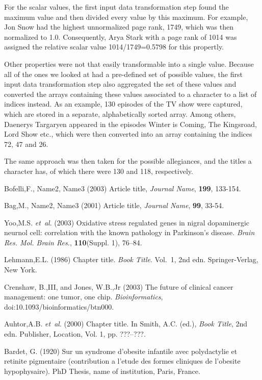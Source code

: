 \documentclass{bioinfo}
\begin{document}
For the scalar values, the first input data transformation step found the maximum value and then divided every value by this maximum. For example, Jon Snow had the highest unnormalized page rank, 1749, which was then normalized to 1.0. Consequently, Arya Stark with a page rank of 1014 was assigned the relative scalar value 1014/1749=0.5798 for this propertly.

Other properties were not that easily transformable into a single value. Because all of the ones we looked at had a pre-defined set of possible values, the first input data transformation step also aggregated the set of these values and converted the arrays containing these values associated to a character to a list of indices instead. As an example, 130 episodes of the TV show were captured, which are stored in a separate, alphabetically sorted array. Among others, Daenerys Targaryen appeared in the episodes Winter is Coming, The Kingsroad, Lord Show etc., which were then converted into an array containing the indices 72, 47 and 26.

The same approach was then taken for the possible allegiances, and the titles a character has, of which there were 130 and 118, respectively.





%
%
%
%
%
%
%
%
%


\begin{thebibliography}{}

Bofelli,F., Name2, Name3 (2003) Article title, {\it Journal Name}, {\bf 199}, 133-154.

Bag,M., Name2, Name3 (2001) Article title, {\it Journal Name}, {\bf 99}, 33-54.

Yoo,M.S. \textit{et~al}. (2003) Oxidative stress regulated genes
in nigral dopaminergic neurnol cell: correlation with the known
pathology in Parkinson's disease. \textit{Brain Res. Mol. Brain
Res.}, \textbf{110}(Suppl. 1), 76--84.

Lehmann,E.L. (1986) Chapter title. \textit{Book Title}. Vol.~1, 2nd edn. Springer-Verlag, New York.

Crenshaw, B.,III, and Jones, W.B.,Jr (2003) The future of clinical
cancer management: one tumor, one chip. \textit{Bioinformatics},
doi:10.1093/bioinformatics/btn000.

Auhtor,A.B. \textit{et~al}. (2000) Chapter title. In Smith, A.C.
(ed.), \textit{Book Title}, 2nd edn. Publisher, Location, Vol. 1, pp.
???--???.

Bardet, G. (1920) Sur un syndrome d'obesite infantile avec
polydactylie et retinite pigmentaire (contribution a l'etude des
formes cliniques de l'obesite hypophysaire). PhD Thesis, name of
institution, Paris, France.

\end{thebibliography}
\end{document}
